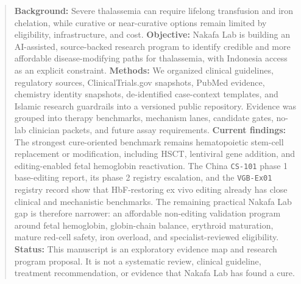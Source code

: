 \begin{abstract}
\textbf{Background:} Severe thalassemia can require lifelong transfusion and
iron chelation, while curative or near-curative options remain limited by
eligibility, infrastructure, and cost.
\textbf{Objective:} Nakafa Lab is building an AI-assisted, source-backed
research program to identify credible and more affordable disease-modifying
paths for thalassemia, with Indonesia access as an explicit constraint.
\textbf{Methods:} We organized clinical guidelines, regulatory sources,
ClinicalTrials.gov snapshots, PubMed evidence, chemistry identity snapshots,
de-identified case-context templates, and Islamic research guardrails into a
versioned public repository. Evidence was grouped into therapy benchmarks,
mechanism lanes, candidate gates, no-lab clinician packets, and future assay
requirements.
\textbf{Current findings:} The strongest cure-oriented benchmark remains
hematopoietic stem-cell replacement or modification, including HSCT, lentiviral
gene addition, and editing-enabled fetal hemoglobin reactivation. The China
\texttt{CS-101} phase 1 base-editing report, its phase 2 registry escalation,
and the \texttt{VGB-Ex01} registry record show that HbF-restoring ex vivo
editing already has close clinical and mechanistic benchmarks. The remaining
practical Nakafa Lab gap is therefore narrower: an affordable non-editing
validation program around fetal hemoglobin, globin-chain balance, erythroid
maturation, mature red-cell safety, iron overload, and specialist-reviewed
eligibility.
\textbf{Status:} This manuscript is an exploratory evidence map and research
program proposal. It is not a systematic review, clinical guideline, treatment
recommendation, or evidence that Nakafa Lab has found a cure.
\end{abstract}
